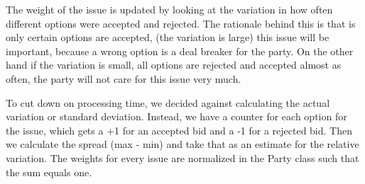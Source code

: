 \documentclass[a4,11pt]{scrartcl}
\begin{document}
The weight of the issue is updated by looking at the variation in how 
often different options were accepted and rejected. The rationale 
behind this is that is only certain options are accepted, (the 
variation is large) this issue will be important, because a wrong 
option is a deal breaker for the party. On the other hand if the 
variation is small, all options are rejected and accepted almost as
often, the party will not care for this issue very much.

To cut down on processing time, we decided against calculating the
actual variation or standard deviation. Instead, we have a counter for
each option for the issue, which gets a +1 for an accepted bid and a
-1 for a rejected bid. Then we calculate the spread (max - min) and
take that as an estimate for the relative variation. The weights for
every issue are normalized in the Party class such that the sum equals
one.
\end{document}
